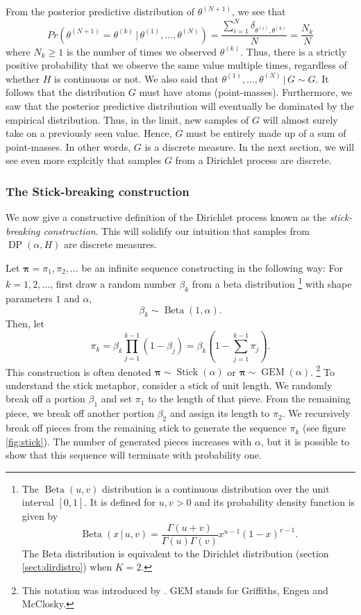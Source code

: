 \documentclass[final,3p,times,twocolumn]{elsarticle}
\DeclareMathOperator*{\DP}{DP}
\DeclareMathOperator*{\Beta}{Beta}
\DeclareMathOperator*{\GEM}{GEM}
\DeclareMathOperator*{\Stick}{Stick}
\let\bs\boldsymbol
\begin{document}
From the posterior predictive distribution of $\theta^{(N+1)}$, we see that
\begin{equation}
\label{eqn:dpprobsame}
Pr(\theta^{(N+1)} = \theta^{(k)} \,|\,\theta^{(1)},\dots,\theta^{(N)}) = \frac{\sum_{i=1}^N \delta_{\theta^{(i)},\theta^{(k)}}}{N} = \frac{N_k}{N}
\end{equation}
where $N_k \geq 1$ is the number of times we observed $\theta^{(k)}$.
Thus, there is a strictly positive probability that we observe the same value multiple times, regardless of whether $H$ is continuous or not.
We also said that $\theta^{(1)},\dots,\theta^{(N)} \,|\,G \sim G$.
It follows that the distribution $G$ must have atoms (point-masses).
Furthermore, we saw that the posterior predictive distribution will eventually be dominated by the empirical distribution.
Thus, in the limit, new samples of $G$ will almost surely take on a previously seen value. 
Hence, $G$ must be entirely made up of a sum of point-masses. 
In other words, $G$ is a discrete measure.
In the next section, we will see even more explcitly that samples $G$ from a Dirichlet process are discrete.

\subsubsection*{\normalfont \small \bfseries The Stick-breaking construction}
We now give a constructive definition of the Dirichlet process known as the \emph{stick-breaking construction}.
This will solidify our intuition that samples from $\DP(\alpha,H)$ are discrete measures.

Let $\bs \pi = {\pi_1,\pi_2,\dots}$ be an infinite sequence constructing in the following way:
For $k=1,2,\dots$, first draw a random number $\beta_k$ from a beta distribution
\footnote{The $\Beta(u,v)$ distribution is a continuous distribution over the unit interval $[0,1]$. It is defined for $u,v > 0$ and its probability density function is given by
\[
\Beta(x\,|\,u,v) = \frac{\Gamma(u+v)}{\Gamma(u)\Gamma(v)}x^{u-1}(1-x)^{v-1}.
\]
The Beta distribution is equivalent to the Dirichlet distribution (section \ref{sect:dirdistro}) when $K=2$.}
with shape parameters $1$ and $\alpha$,
\begin{equation}
\beta_k \sim \Beta(1,\alpha).
\end{equation}
Then, let
\begin{equation}
\pi_k = \beta_k \prod_{j=1}^{k-1} (1-\beta_j) = \beta_k (1 - \sum_{j=1}^{k-1} \pi_j).
\end{equation}
This construction is often denoted $\bs \pi \sim \Stick(\alpha)$ or $\bs \pi \sim \GEM(\alpha)$.
\footnote{
This notation was introduced by \cite{ewens1990}.
GEM stands for Griffiths, Engen and McClosky.}
To understand the stick metaphor, consider a stick of unit length. 
We randomly break off a portion $\beta_1$ and set $\pi_1$ to the length of that pieve. 
From the remaining piece, we break off another portion $\beta_2$ and assign its length to $\pi_2$.
We recursively break off pieces from the remaining stick to generate the sequence $\pi_k$ (see figure \ref{fig:stick}).
The number of generated pieces increases with $\alpha$, but it is possible to show that this sequence will terminate with probability one.
\end{document}
